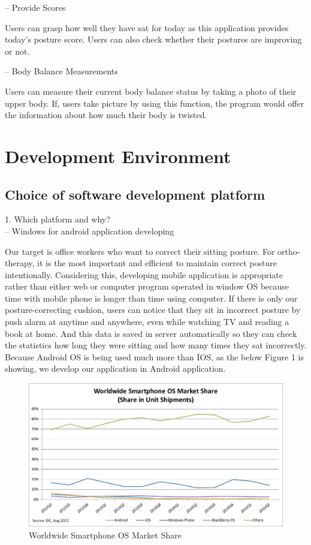 \documentclass[conference]{IEEEtran}
\begin{document}
-- Provide Scores

Users can grasp how well they have sat for today as this application provides today's posture score. Users can also check whether their postures are improving or not.

-- Body Balance Measurements

Users can measure their current body balance status by taking a photo of their upper body. If, users take picture by using this function, the program would offer the information about how much their body is twisted. 

\section{Development Environment}

\subsection{Choice of software development platform}

1. Which platform and why?  \\

-- Windows for android application developing

Our target is office workers who want to correct their sitting posture. For ortho-therapy, it is the most important and efficient to maintain correct posture intentionally. Considering this, developing mobile application is appropriate rather than either web or computer program operated in window OS because time with mobile phone is longer than time using computer. If there is only our posture-correcting cushion, users can notice that they sit in incorrect posture by push alarm at anytime and anywhere, even while watching TV and reading a book at home. And this data is saved in server automatically so they can check the statistics how long they were sitting and how many times they sat incorrectly. Because Android OS is being used much more than IOS, as the below Figure 1 is showing, we develop our application in Android application.

\begin{figure}[htbp]
\begin{center}
    \includegraphics[scale=0.4]{img_03.png}
    \caption{Worldwide Smartphone OS Market Share} 
\end{center}
\end{figure}
\end{document}
